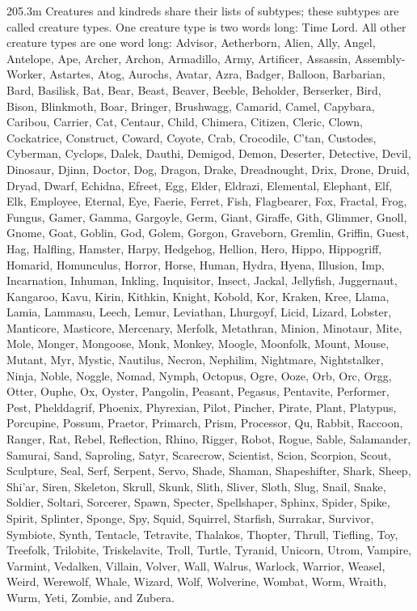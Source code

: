 205.3m Creatures and kindreds share their lists of subtypes; these subtypes are called creature types. One creature type is two words long: Time Lord. All other creature types are one word long: Advisor, Aetherborn, Alien, Ally, Angel, Antelope, Ape, Archer, Archon, Armadillo, Army, Artificer, Assassin, Assembly-Worker, Astartes, Atog, Aurochs, Avatar, Azra, Badger, Balloon, Barbarian, Bard, Basilisk, Bat, Bear, Beast, Beaver, Beeble, Beholder, Berserker, Bird, Bison, Blinkmoth, Boar, Bringer, Brushwagg, Camarid, Camel, Capybara, Caribou, Carrier, Cat, Centaur, Child, Chimera, Citizen, Cleric, Clown, Cockatrice, Construct, Coward, Coyote, Crab, Crocodile, C’tan, Custodes, Cyberman, Cyclops, Dalek, Dauthi, Demigod, Demon, Deserter, Detective, Devil, Dinosaur, Djinn, Doctor, Dog, Dragon, Drake, Dreadnought, Drix, Drone, Druid, Dryad, Dwarf, Echidna, Efreet, Egg, Elder, Eldrazi, Elemental, Elephant, Elf, Elk, Employee, Eternal, Eye, Faerie, Ferret, Fish, Flagbearer, Fox, Fractal, Frog, Fungus, Gamer, Gamma, Gargoyle, Germ, Giant, Giraffe, Gith, Glimmer, Gnoll, Gnome, Goat, Goblin, God, Golem, Gorgon, Graveborn, Gremlin, Griffin, Guest, Hag, Halfling, Hamster, Harpy, Hedgehog, Hellion, Hero, Hippo, Hippogriff, Homarid, Homunculus, Horror, Horse, Human, Hydra, Hyena, Illusion, Imp, Incarnation, Inhuman, Inkling, Inquisitor, Insect, Jackal, Jellyfish, Juggernaut, Kangaroo, Kavu, Kirin, Kithkin, Knight, Kobold, Kor, Kraken, Kree, Llama, Lamia, Lammasu, Leech, Lemur, Leviathan, Lhurgoyf, Licid, Lizard, Lobster, Manticore, Masticore, Mercenary, Merfolk, Metathran, Minion, Minotaur, Mite, Mole, Monger, Mongoose, Monk, Monkey, Moogle, Moonfolk, Mount, Mouse, Mutant, Myr, Mystic, Nautilus, Necron, Nephilim, Nightmare, Nightstalker, Ninja, Noble, Noggle, Nomad, Nymph, Octopus, Ogre, Ooze, Orb, Orc, Orgg, Otter, Ouphe, Ox, Oyster, Pangolin, Peasant, Pegasus, Pentavite, Performer, Pest, Phelddagrif, Phoenix, Phyrexian, Pilot, Pincher, Pirate, Plant, Platypus, Porcupine, Possum, Praetor, Primarch, Prism, Processor, Qu, Rabbit, Raccoon, Ranger, Rat, Rebel, Reflection, Rhino, Rigger, Robot, Rogue, Sable, Salamander, Samurai, Sand, Saproling, Satyr, Scarecrow, Scientist, Scion, Scorpion, Scout, Sculpture, Seal, Serf, Serpent, Servo, Shade, Shaman, Shapeshifter, Shark, Sheep, Shi’ar, Siren, Skeleton, Skrull, Skunk, Slith, Sliver, Sloth, Slug, Snail, Snake, Soldier, Soltari, Sorcerer, Spawn, Specter, Spellshaper, Sphinx, Spider, Spike, Spirit, Splinter, Sponge, Spy, Squid, Squirrel, Starfish, Surrakar, Survivor, Symbiote, Synth, Tentacle, Tetravite, Thalakos, Thopter, Thrull, Tiefling, Toy, Treefolk, Trilobite, Triskelavite, Troll, Turtle, Tyranid, Unicorn, Utrom, Vampire, Varmint, Vedalken, Villain, Volver, Wall, Walrus, Warlock, Warrior, Weasel, Weird, Werewolf, Whale, Wizard, Wolf, Wolverine, Wombat, Worm, Wraith, Wurm, Yeti, Zombie, and Zubera.

